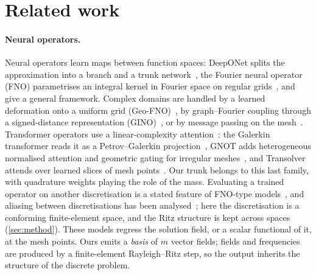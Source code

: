 \section{Related work}\label{sec:related}

\paragraph{Neural operators.}
Neural operators learn maps between function spaces: DeepONet splits the approximation into a branch and a trunk network~\citep{lu2021learning}, the Fourier neural operator (FNO) parametrises an integral kernel in Fourier space on regular grids~\citep{li2021fourier}, and \citet{kovachki2023neural} give a general framework.
Complex domains are handled by a learned deformation onto a uniform grid (Geo-FNO)~\citep{li2023fourier}, by graph--Fourier coupling through a signed-distance representation (GINO)~\citep{li2023geometry}, or by message passing on the mesh~\citep{pfaff2021learning}.
Transformer operators use a linear-complexity attention~\citep{katharopoulos2020transformers}: the Galerkin transformer reads it as a Petrov--Galerkin projection~\citep{cao2021choose}, GNOT adds heterogeneous normalised attention and geometric gating for irregular meshes~\citep{hao2023gnot}, and Transolver attends over learned slices of mesh points~\citep{wu2024transolver}.
Our trunk belongs to this last family, with quadrature weights playing the role of the mass.
Evaluating a trained operator on another discretisation is a stated feature of FNO-type models~\citep{li2021fourier}, and aliasing between discretisations has been analysed~\citep{bartolucci2023representation}; here the discretisation is a conforming finite-element space, and the Ritz structure is kept across spaces (\cref{sec:method}).
These models regress the solution field, or a scalar functional of it, at the mesh points.
Ours emits a \emph{basis} of $m$ vector fields; fields and frequencies are produced by a finite-element Rayleigh--Ritz step, so the output inherits the structure of the discrete problem.

